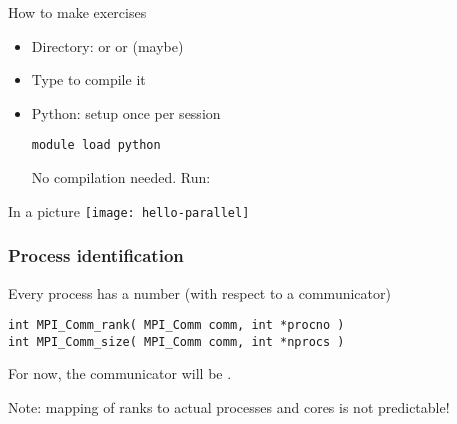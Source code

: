 \begin{frame}[containsverbatim]{How to make exercises}
  \begin{itemize}
  \item Directory:  or  or (maybe) 
  \item Type  to compile it
  \item Python: setup once per session
\begin{verbatim}
module load python
\end{verbatim}
    No compilation needed. Run:\\ 
  \end{itemize}
\end{frame}

\begin{frame}{In a picture}
  \texttt{[image: hello-parallel]}
\end{frame}

\begin{frame}[containsverbatim]\frametitle{Process identification}
Every process has a number (with respect to a communicator)
\begin{verbatim}
int MPI_Comm_rank( MPI_Comm comm, int *procno )
int MPI_Comm_size( MPI_Comm comm, int *nprocs )
\end{verbatim}
For now, the communicator will be .

Note: mapping of ranks to actual processes and cores is not predictable!
\end{frame}

